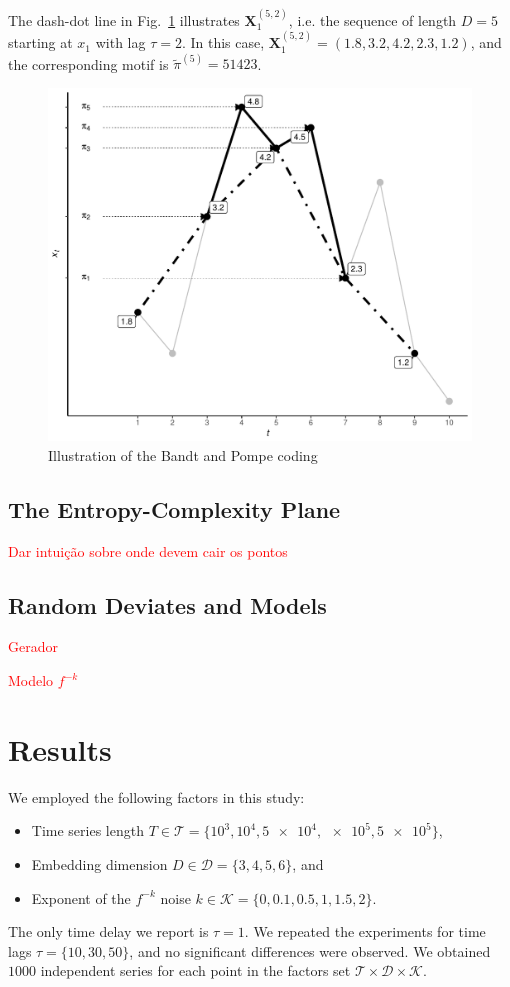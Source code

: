 \documentclass[sts]{imsart}
\begin{document}
The dash-dot line in Fig.~\ref{Fig:IntroBP} illustrates $\mathbf X_{1}^{(5,2)}$, i.e. the sequence of length $D=5$ starting at $x_1$ with lag $\tau=2$.
In this case, $\mathbf X_{1}^{(5,2)}= (1.8, 3.2, 4.2, 2.3, 1.2)$, and the corresponding motif is $\widetilde{\pi}^{(5)}=51423$.

\begin{figure}[hbt]
\centering
\includegraphics[width=.7\linewidth]{IntroBP}
\caption{Illustration of the Bandt and Pompe coding\label{Fig:IntroBP}}
\end{figure}

\subsection{The Entropy-Complexity Plane}

\textcolor{red}{Dar intui\c c\~ao sobre onde devem cair os pontos}

%


\subsection{Random Deviates and Models}

\textcolor{red}{Gerador}

\textcolor{red}{Modelo $f^{-k}$}

\section{Results}\label{Sec:Results}

We employed the following factors in this study:
\begin{itemize}
\item Time series length $T\in\mathcal T=\{10^3,10^4, \num[scientific-notation=true]{5 e4}, \num[scientific-notation=true]{e5}, \num[scientific-notation=true]{5 e5}\}$,
\item Embedding dimension $D\in\mathcal D=\{3, 4, 5, 6\}$, and
\item Exponent of the $f^{-k}$ noise $k\in\mathcal K=\{0, 0.1, 0.5, 1, 1.5, 2\}$.
\end{itemize}
The only time delay we report is $\tau=1$.
We repeated the experiments for time lags $\tau=\{10,30,50\}$, and no significant differences were observed.
We obtained $1000$ independent series for each point in the factors set $\mathcal T\times \mathcal D\times \mathcal K$.
\end{document}
